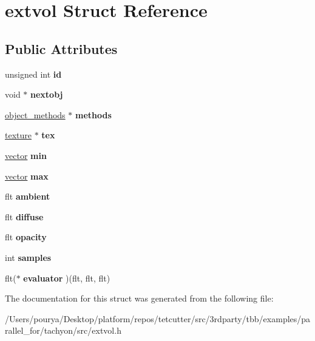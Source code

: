 \hypertarget{structextvol}{}\section{extvol Struct Reference}
\label{structextvol}
\subsection*{Public Attributes}
\begin{DoxyCompactItemize}
\item 
\hypertarget{structextvol_a1193914d0ef8e46b43ecf68fee5e2d23}{}unsigned int {\bfseries id}\label{structextvol_a1193914d0ef8e46b43ecf68fee5e2d23}

\item 
\hypertarget{structextvol_a58ebda8de44ade3c4759981156a89aa3}{}void $\ast$ {\bfseries nextobj}\label{structextvol_a58ebda8de44ade3c4759981156a89aa3}

\item 
\hypertarget{structextvol_aabd83108814556f84870c79c2aa9abb5}{}\hyperlink{structobject__methods}{object\+\_\+methods} $\ast$ {\bfseries methods}\label{structextvol_aabd83108814556f84870c79c2aa9abb5}

\item 
\hypertarget{structextvol_a81f900046d308fe9af2dfa0668635970}{}\hyperlink{structtexture}{texture} $\ast$ {\bfseries tex}\label{structextvol_a81f900046d308fe9af2dfa0668635970}

\item 
\hypertarget{structextvol_a5cd581206a544cd914e31da3eb8e3538}{}\hyperlink{structvector}{vector} {\bfseries min}\label{structextvol_a5cd581206a544cd914e31da3eb8e3538}

\item 
\hypertarget{structextvol_a93c5398e5a355ef02df90482b8153bda}{}\hyperlink{structvector}{vector} {\bfseries max}\label{structextvol_a93c5398e5a355ef02df90482b8153bda}

\item 
\hypertarget{structextvol_a85d5b671a302ae94ee20eebdf207ed37}{}flt {\bfseries ambient}\label{structextvol_a85d5b671a302ae94ee20eebdf207ed37}

\item 
\hypertarget{structextvol_adcc1518eb2aa9ec9b89e92a10a95c88c}{}flt {\bfseries diffuse}\label{structextvol_adcc1518eb2aa9ec9b89e92a10a95c88c}

\item 
\hypertarget{structextvol_a170d21162034572ab444af724cae8921}{}flt {\bfseries opacity}\label{structextvol_a170d21162034572ab444af724cae8921}

\item 
\hypertarget{structextvol_a06dfefa427c60eff39ce5006b47e41fb}{}int {\bfseries samples}\label{structextvol_a06dfefa427c60eff39ce5006b47e41fb}

\item 
\hypertarget{structextvol_a1640e0f0d6a68fa449b17ad50c702669}{}flt($\ast$ {\bfseries evaluator} )(flt, flt, flt)\label{structextvol_a1640e0f0d6a68fa449b17ad50c702669}

\end{DoxyCompactItemize}


The documentation for this struct was generated from the following file\+:\begin{DoxyCompactItemize}
\item 
/\+Users/pourya/\+Desktop/platform/repos/tetcutter/src/3rdparty/tbb/examples/parallel\+\_\+for/tachyon/src/extvol.\+h\end{DoxyCompactItemize}

